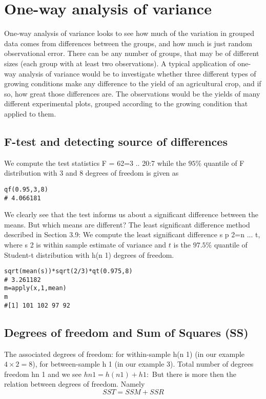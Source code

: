 \documentclass[a4paper,12pt]{article}
\begin{document}
\section{One-way analysis of variance}
One-way analysis of variance looks to see how much of the variation in grouped data comes from differences between the groups, and how much is just random observational error. There can be any number of groups, that may be of different sizes (each group with at least two observations). 
A typical application of one-way analysis of variance would be to investigate whether three different types of growing conditions make any difference to the yield of an agricultural crop, and if so, how great those differences are. The observations would be the yields of many different experimental plots, grouped according to the growing condition that applied to them.





\subsection{F-test and detecting source of differences}
We compute the test statistics F = 62=3 .. 20:7 while the $95\%$ quantile of F
distribution with 3 and 8 degrees of freedom is given as
\begin{verbatim}
qf(0.95,3,8)
# 4.066181
\end{verbatim}
We clearly see that the test informs us about a significant difference between
the means.
But which means are different? The least significant difference method
described in Section 3.9:
We compute the least significant difference s
p
2=n ... t, where s
2
is within
sample estimate of variance and $t$ is the $97.5\%$ quantile of Student-t
distribution with h(n  1) degrees of freedom.

\begin{verbatim}
sqrt(mean(s))*sqrt(2/3)*qt(0.975,8)
# 3.261182
m=apply(x,1,mean)
m
#[1] 101 102 97 92
\end{verbatim}

\subsection{Degrees of freedom and Sum of Squares (SS)}
The associated degrees of freedom: for within-sample h(n  1) (in our example $4 \times 2 = 8$), for between-sample
h  1 (in our example 3).
Total number of degrees freedom hn  1 and we see
$hn  1 = h(n  1) + h  1:$
But there is more then the relation between degrees of freedom. Namely
\[ SST = SSM + SSR \]
\end{document}
